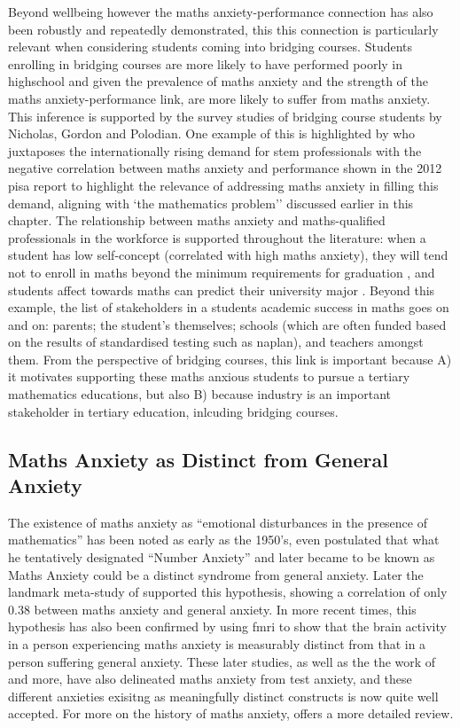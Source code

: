 \documentclass[twoside,12pt,a4paper]{report}
\begin{document}
Beyond wellbeing however the maths anxiety-performance connection has also been robustly and repeatedly demonstrated, this this connection is particularly relevant when considering students coming into bridging courses. Students enrolling in bridging courses are more likely to have performed poorly in highschool and given the prevalence of maths anxiety and the strength of the maths anxiety-performance link, are more likely to suffer from maths anxiety. This inference is supported by the survey studies of bridging course students by Nicholas, Gordon and Polodian. One example of this is highlighted by  who juxtaposes the internationally rising demand for \gls{stem} professionals with the negative correlation between maths anxiety and performance shown in the 2012 \gls{pisa} report \cite{PISA2013} to highlight the relevance of addressing maths anxiety in filling this demand, aligning with `the mathematics problem'' discussed earlier in this chapter. The relationship between maths anxiety and maths-qualified professionals in the workforce is supported throughout the literature: when a student has low self-concept (correlated with high maths anxiety), they will tend not to enroll in maths beyond the minimum requirements for graduation \cite{Ashcraft2007book}, and students affect towards maths can predict their university major \cite{LeFevre1992}. Beyond this example, the list of stakeholders in a students academic success in maths goes on and on: parents; the student's themselves; schools (which are often funded based on the results of standardised testing such as \gls{naplan}), and teachers amongst them. From the perspective of bridging courses, this link is important because A) it motivates supporting these maths anxious students to pursue a tertiary mathematics educations, but also B) because industry is an important stakeholder in tertiary education, inlcuding bridging courses. 


\subsection*{Maths Anxiety as Distinct from General Anxiety}

The existence of maths anxiety as ``emotional disturbances in the presence of mathematics'' has been noted as early as the 1950's,  even postulated that what he tentatively designated ``Number Anxiety'' and later became to be known as Maths Anxiety could be a distinct syndrome from general anxiety. Later the landmark meta-study of  supported this hypothesis, showing a correlation of only $0.38$ between maths anxiety and general anxiety. In more recent times, this hypothesis has also been confirmed by  using \gls{fmri} to show that the brain activity in a person experiencing maths anxiety is measurably distinct from that in a person suffering general anxiety. These later studies, as well as the the work of  and more, have also delineated maths anxiety from test anxiety, and these different anxieties exisitng as meaningfully distinct constructs is now quite well accepted. For more on the history of maths anxiety,  offers a more detailed review.
\end{document}
